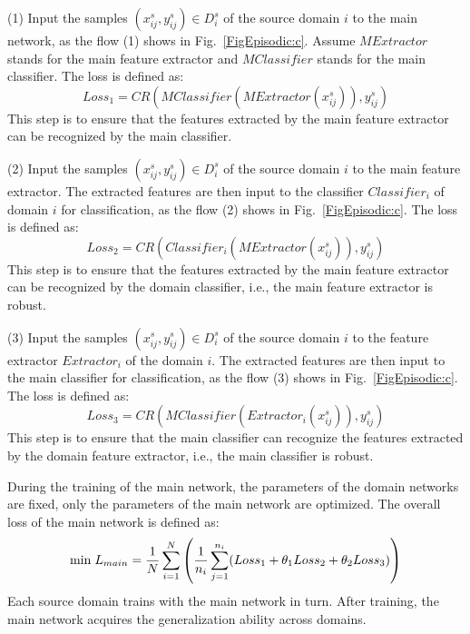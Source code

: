 \documentclass[journal]{IEEEtran}
\begin{document}
(1) Input the samples $(x_{ij}^{s},y_{ij}^{s}) \in D_{i}^{s}$ of the source domain $i$ to the main network, as the flow (1) shows in Fig.~\ref{FigEpisodic:c}. Assume $MExtractor$ stands for the main feature extractor and $MClassifier$ stands for the main classifier. The loss is defined as:
\begin{equation}
    Loss_1 = CR(MClassifier(MExtractor(x_{ij}^{s})),y_{ij}^{s})
\end{equation}
This step is to ensure that the features extracted by the main feature extractor can be recognized by the main classifier.

(2) Input the samples $(x_{ij}^{s},y_{ij}^{s}) \in D_{i}^{s}$ of the source domain $i$ to the main feature extractor. The extracted features are then input to the classifier $Classifier_i$ of domain $i$ for classification, as the flow (2) shows in Fig.~\ref{FigEpisodic:c}. The loss is defined as:
\begin{equation}
    Loss_2 = CR(Classifier_i(MExtractor(x_{ij}^{s})),y_{ij}^{s})
\end{equation}
This step is to ensure that the features extracted by the main feature extractor can be recognized by the domain classifier, i.e., the main feature extractor is robust.

(3) Input the samples $(x_{ij}^{s},y_{ij}^{s}) \in D_{i}^{s}$ of the source domain $i$ to the feature extractor $Extractor_i$ of the domain $i$. The extracted features are then input to the main classifier for classification, as the flow (3) shows in Fig.~\ref{FigEpisodic:c}. The loss is defined as:
\begin{equation}
    Loss_3 = CR(MClassifier(Extractor_i(x_{ij}^{s})),y_{ij}^{s})
\end{equation}
This step is to ensure that the main classifier can recognize the features extracted by the domain feature extractor, i.e., the main classifier is robust.

During the training of the main network, the parameters of the domain networks are fixed, only the parameters of the main network are optimized. The overall loss of the main network is defined as:
\begin{equation} 
\footnotesize
		 {\rm min} \ L_{main} = \frac{1}{N}\sum_{i=1}^{N}\left(\frac{1}{n_i}\sum_{j=1}^{n_i}(Loss_1 + \theta_{1} Loss_2 + \theta_{2} Loss_3)\right)
\end{equation}
Each source domain trains with the main network in turn. After training, the main network acquires the generalization ability across domains.
\end{document}
